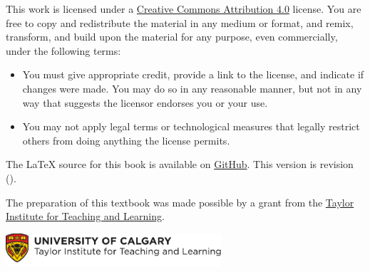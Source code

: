 \bigskip

\noindent \footnotesize This work is licensed under a \href{https://creativecommons.org/licenses/by/4.0/}{Creative Commons Attribution 4.0} license. 
You are free to copy and redistribute the material in any medium or format, and  remix, transform, and build upon the material for any purpose, even commercially, under the following terms:
\begin{itemize}
\item You must give appropriate credit, provide a link to the license, and indicate if changes were made. You may do so in any reasonable manner, but not in any way that suggests the licensor endorses you or your use.
\item You may not apply legal terms or technological measures that legally restrict others from doing anything the license permits.
\end{itemize}

\vfil\normalsize\noindent
The \LaTeX{} source for this book is available
on \href{https://github.com/rzach/forallx-yyc/}{GitHub}. This version
is revision \gitAbbrevHash{} (\gitAuthorDate).

\bigskip
\noindent The preparation of this textbook was made possible by a grant from the \href{http://www.ucalgary.ca/taylorinstitute/}{Taylor Institute for Teaching and Learning}.

\bigskip
\noindent
\href{http://www.ucalgary.ca/taylorinstitute/}{\includegraphics[width=8cm]{assets/ti-color}}
\normalsize 
